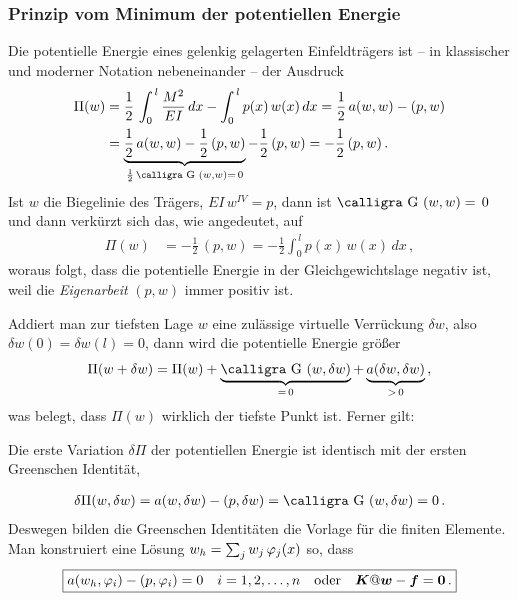 {{{{{\textcolor{sectionTitleBlue}{\subsubsection*{Prinzip vom Minimum der potentiellen Energie}}}
Die potentielle Energie eines gelenkig gelagerten Einfeldtr\"{a}gers ist -- in klassischer und moderner Notation nebeneinander -- der Ausdruck
\begin{align}
\Pi(w) &=\frac{1}{2}\, \int_0^{\,l} \frac{M^2}{EI}\,dx - \int_0^{\,l} p(x)\,w(x)\,dx = \frac{1}{2}\, a(w,w) - (p,w)\nn\\
 &=  \underbrace{\frac{1}{2}\, a(w,w) - \frac{1}{2}\,(p,w)}_{\frac{1}{2}\,\text{\normalfont\calligra G\,\,}(w,w) = \,0} - \frac{1}{2}\,(p,w) = - \frac{1}{2}\,(p,w) \,.
\end{align}
Ist $w$ die Biegelinie des Tr\"{a}gers, $EI\,w^{IV} = p$, dann ist $\text{\normalfont\calligra G\,\,}(w,w) = \,0$  und dann verk\"{u}rzt sich das, wie angedeutet, auf
\begin{align}
\Pi(w) &=- \frac{1}{2}\,(p,w) = - \frac{1}{2} \int_0^{\,l} p(x)\,w(x)\,dx\,,
\end{align}
woraus folgt, dass die potentielle Energie in der Gleichgewichtslage negativ ist, weil die {\em Eigenarbeit\/} $(p,w)$ immer positiv ist.

Addiert man zur tiefsten Lage $w$ eine zul\"{a}ssige virtuelle Verr\"{u}ckung $\delta w$, also $\delta w(0) = \delta w(l) = 0$, dann wird die potentielle Energie gr\"{o}{\ss}er
\begin{align}
\Pi(w + \delta w) = \Pi(w) + \underbrace{\text{\normalfont\calligra G\,\,}(w,\delta w)}_{=\, 0} + \underbrace{a(\delta w,\delta w)}_{> \,0}\,,
\end{align}
was belegt, dass $\Pi(w)$ wirklich der tiefste Punkt ist. Ferner gilt:\\

\hspace*{-12pt}\colorbox{highlightBlue}{\parbox{0.98\textwidth}{Die erste Variation $\delta \Pi$ der potentiellen Energie ist identisch mit der ersten Greenschen Identit\"{a}t,}}
\begin{align}
\delta \Pi(w, \delta w) = a(w, \delta w) - (p, \delta w) = \text{\normalfont\calligra G\,\,}(w,\delta w) = 0\,.
\end{align}
Deswegen bilden die Greenschen Identit\"{a}ten die Vorlage f\"{u}r die finiten Elemente. Man konstruiert eine L\"{o}sung $w_h = \sum_j w_j\,\varphi_j(x)$ so, dass
\begin{align}\label{Eq190}
\boxed{ a(w_h, \varphi_i) - (p, \varphi_i)= 0 \quad i = 1,2,\ldots, n \quad \text{oder}\quad \mbox{\boldmath $K$} @\mbox{\boldmath $w$} - \mbox{\boldmath $f$} = \mbox{\boldmath $0$}\,.}
\end{align}

}}}}
